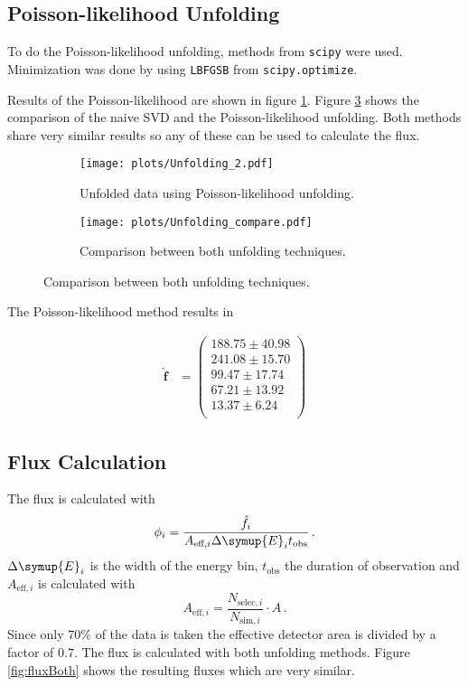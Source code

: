 \subsection{Poisson-likelihood Unfolding}
To do the Poisson-likelihood unfolding, methods from \texttt{scipy} were used.
Minimization was done by using \texttt{L\-BFGS\-B} from \texttt{scipy.optimize}.

Results of the Poisson-likelihood are shown in figure \ref{fig:pois}.
Figure \ref{fig:comp} shows the comparison of the naive SVD and the Poisson-likelihood unfolding.
Both methods share very similar results so any of these can be used to calculate the flux.

\begin{figure}[H]
\centering
\begin{subfigure}{0.45\textwidth}
  \texttt{[image: plots/Unfolding\_2.pdf]}
  \caption{Unfolded data using Poisson-likelihood unfolding.\label{fig:pois}}
\end{subfigure}
\begin{subfigure}{0.45\textwidth}
  \texttt{[image: plots/Unfolding\_compare.pdf]}
  \caption{Comparison between both unfolding techniques.\label{fig:comp}}
\end{subfigure}
\end{figure}

The Poisson-likelihood method results in

\begin{align}
\hat{\symbf{f}} &=
\begin{pmatrix}
     188.75 \pm 40.98 \\
     241.08 \pm 15.70 \\
     99.47 \pm 17.74 \\
     67.21 \pm 13.92 \\
     13.37 \pm 6.24 \\
\end{pmatrix}
\end{align}

\subsection{Flux Calculation}
The flux is calculated with
\begin{equation}
  \phi_i = \frac{\hat{f}_i}{A_{\text{eff}, i} \Delta\symup{E}_i t_\text{obs}}\,.
  \label{eqn:flux}
\end{equation}
$\Delta\symup{E}_i$ is the width of the energy bin, $t_\text{obs}$ the duration of observation and $A_{\text{eff}, i}$ is calculated with
\begin{equation}
  A_{\text{eff}, i} = \frac{N_{\text{selec}, i}}{N_{\text{sim}, i}} \cdot A\,.
\end{equation}
Since only $70\%$ of the data is taken the effective detector area is divided by a factor of $0.7$.
The flux is calculated with both unfolding methods.
Figure \ref{fig:fluxBoth} shows the resulting fluxes which are very similar.

